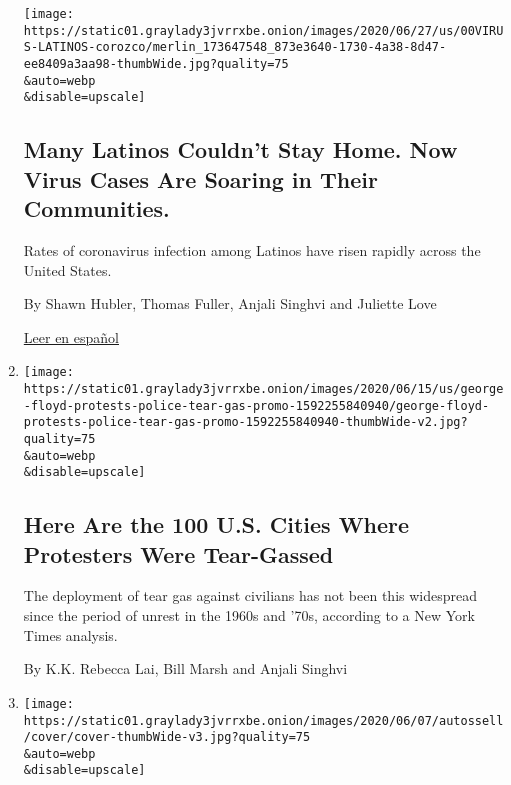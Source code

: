 \begin{enumerate}
  \texttt{[image: https://static01.graylady3jvrrxbe.onion/images/2020/06/27/us/00VIRUS-LATINOS-corozco/merlin\_173647548\_873e3640-1730-4a38-8d47-ee8409a3aa98-thumbWide.jpg?quality=75\\\&auto=webp\\\&disable=upscale]}

  \hypertarget{many-latinos-couldnt-stay-home-now-virus-cases-are-soaring-in-their-communities}{%
  \subsection{Many Latinos Couldn't Stay Home. Now Virus Cases Are
  Soaring in Their
  Communities.}\label{many-latinos-couldnt-stay-home-now-virus-cases-are-soaring-in-their-communities}}

  Rates of coronavirus infection among Latinos have risen rapidly across
  the United States.

  By Shawn Hubler, Thomas Fuller, Anjali Singhvi and Juliette Love

  \href{https://www.nytimes3xbfgragh.onion/es/2020/06/26/espanol/latinos-coronavirus.html}{Leer
  en español}
\item
  \href{/interactive/2020/06/16/us/george-floyd-protests-police-tear-gas.html}{}

  \texttt{[image: https://static01.graylady3jvrrxbe.onion/images/2020/06/15/us/george-floyd-protests-police-tear-gas-promo-1592255840940/george-floyd-protests-police-tear-gas-promo-1592255840940-thumbWide-v2.jpg?quality=75\\\&auto=webp\\\&disable=upscale]}

  \hypertarget{here-are-the-100-us-cities-where-protesters-were-tear-gassed}{%
  \subsection{Here Are the 100 U.S. Cities Where Protesters Were
  Tear-Gassed}\label{here-are-the-100-us-cities-where-protesters-were-tear-gassed}}

  The deployment of tear gas against civilians has not been this
  widespread since the period of unrest in the 1960s and '70s, according
  to a New York Times analysis.

  By K.K. Rebecca Lai, Bill Marsh and Anjali Singhvi
\item
  \href{/interactive/2020/06/07/us/george-floyd-protest-aerial-photos.html}{}

  \texttt{[image: https://static01.graylady3jvrrxbe.onion/images/2020/06/07/autossell/cover/cover-thumbWide-v3.jpg?quality=75\\\&auto=webp\\\&disable=upscale]}


\end{enumerate}

